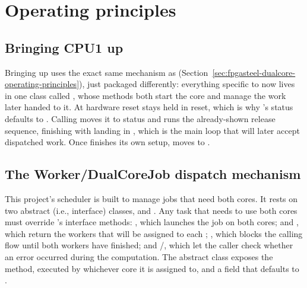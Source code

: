 \section{Operating principles}
\label{sec:fpgasteel-dualcore-forwarding-operating-principles}

\subsection{Bringing CPU1 up}
\label{subsec:fpgasteel-dualcore-forwarding-bringing-cpu1}

Bringing  up uses the exact same mechanism as  (Section~\ref{sec:fpgasteel-dualcore-operating-principles}), just packaged differently: everything specific to  now lives in one  class called , whose methods both start the core and manage the work later handed to it. At hardware reset  stays held in reset, which is why 's status defaults to . Calling  moves it to  status and runs the already-shown release sequence, finishing with  landing in , which is the main loop that will later accept dispatched work. Once  finishes its own setup,  moves to .

\subsection{The Worker/DualCoreJob dispatch mechanism}
\label{subsec:fpgasteel-dualcore-forwarding-dispatch}

This project's scheduler is built to manage jobs that need both cores. It rests on two abstract (i.e., interface) classes,  and . Any task that needs to use both cores must override 's interface methods: , which launches the job on both cores;  and , which return the workers that will be assigned to each ; , which blocks the calling flow until both workers have finished; and /, which let the caller check whether an error occurred during the computation. The abstract class  exposes the  method, executed by whichever core it is assigned to, and a  field that defaults to .

